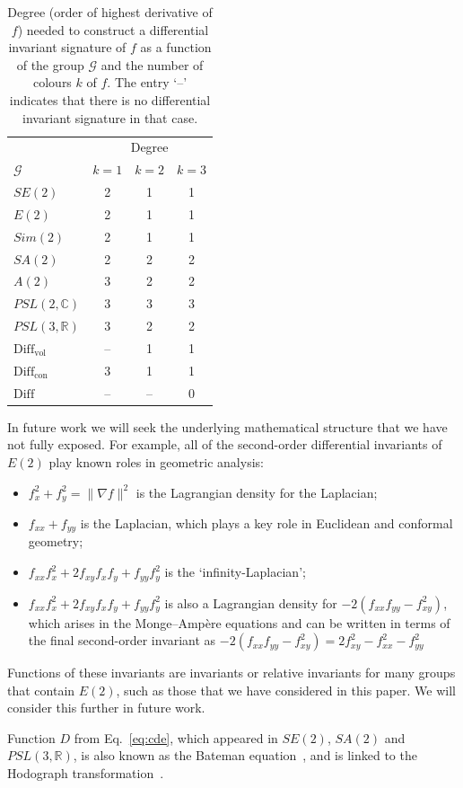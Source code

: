 \documentclass{artjlt}
\def\R{\mathbb{R}}
\begin{document}
\begin{table}[h]
\begin{center}
\begin{tabular}{| l | c c c |}
\hline
 & \multicolumn{3}{|c|}{Degree} \\
$\mathcal{G}$ & $k=1$ & $k=2$ & $k=3$ \\
\hline
$SE(2)$ & 2 &1 & 1 \\
$E(2)$ & 2 & 1 & 1 \\
$Sim(2)$ & 2 & 1 & 1 \\
$SA(2)$ & 2 & 2 & 2 \\
$A(2)$ & 3 & 2 & 2 \\
$PSL(2,\mathbb{C})$ & 3 & 3 & 3 \\
$PSL(3,\R)$ & 3 & 2 & 2 \\
$\mathrm{Diff}_{\mathrm{vol}}$ & -- & 1 & 1 \\
$\mathrm{Diff}_{\mathrm{con}}$ & 3 & 1 & 1 \\
$\mathrm{Diff}$ & -- & -- & 0 \\
\hline
\end{tabular}
\caption{Degree (order of highest derivative of $f$) needed to construct a differential invariant signature of $f$ as a function of the group $\mathcal{G}$ and the number of colours $k$ of $f$. The entry `--' indicates that there is no differential invariant signature in that case.}
\label{tab:derivs}
\end{center}
\end{table}

In future work we will seek the underlying mathematical structure that we have not fully exposed. For example, all of the second-order differential invariants of $E(2)$ play known roles in geometric analysis:

\begin{itemize}
\item $f_x^2 + f_y^2=\|\nabla f\|^2$ is the Lagrangian density for the Laplacian;
\item $f_{xx} + f_{yy}$ is the Laplacian, which plays a key role in Euclidean and conformal geometry;
\item $f_{xx}f_x^2 + 2 f_{xy} f_x f_y + f_{yy} f_y^2 $ is the `infinity-Laplacian'; 
\item $f_{xx}f_x^2 + 2 f_{xy} f_x f_y + f_{yy} f_y^2 $ is also a Lagrangian density for $-2(f_{xx} f_{yy} - f_{xy}^2)$, which arises in the Monge--Amp\`ere equations and can be written in terms of the final second-order invariant as $-2 (f_{xx} f_{yy} - f_{xy}^2) = 2 f_{xy}^2 - f_{xx}^2 - f_{yy}^2$
\end{itemize}

Functions of these invariants are invariants or relative invariants for many groups that contain $E(2)$, such as those that we have considered in this paper.  We will consider this further in future work.

Function $D$ from Eq.~\eqref{eq:cde}, which appeared in $SE(2)$, $SA(2)$ and $PSL(3,\mathbb{R})$, is also known as the Bateman equation~\citep{Andriopoulos}, and is linked to the Hodograph transformation~\citep{Rosenhaus}.




\end{document}
